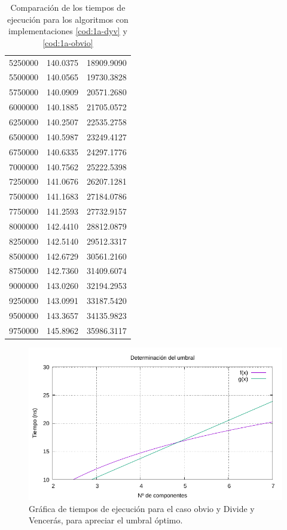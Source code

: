 \begin{table}
\begin{tabular}{|r|r|r|}
		5250000 & 140.0375 & 18909.9090 \\ 
		5500000 & 140.0565 & 19730.3828 \\ 
		5750000 & 140.0909 & 20571.2680 \\ 
		6000000 & 140.1885 & 21705.0572 \\ 
		6250000 & 140.2507 & 22535.2758 \\ 
		6500000 & 140.5987 & 23249.4127 \\ 
		6750000 & 140.6335 & 24297.1776 \\ 
		7000000 & 140.7562 & 25222.5398 \\ 
		7250000 & 141.0676 & 26207.1281 \\ 
		7500000 & 141.1683 & 27184.0786 \\ 
		7750000 & 141.2593 & 27732.9157 \\ 
		8000000 & 142.4410 & 28812.0879 \\ 
		8250000 & 142.5140 & 29512.3317 \\ 
		8500000 & 142.6729 & 30561.2160 \\ 
		8750000 & 142.7360 & 31409.6074 \\ 
		9000000 & 143.0260 & 32194.2953 \\ 
		9250000 & 143.0991 & 33187.5420 \\ 
		9500000 & 143.3657 & 34135.9823 \\ 
		9750000 & 145.8962 & 35986.3117 \\ 
		\hline
	\end{tabular}

	\caption{Comparación de los tiempos de ejecución para los algoritmos con implementaciones \ref{cod:1a-dyv} y \ref{cod:1a-obvio}}
	\label{tab:1a-com}
\end{table}

\begin{figure}[h]
	\centering
	\includegraphics[scale=0.76]{img/e1a-umbral.pdf}
	\caption{Gráfica de tiempos de ejecución para el caso obvio y Divide y Vencerás, para apreciar el umbral
	óptimo.}
	\label{fig:1a-com-graph}
\end{figure}

